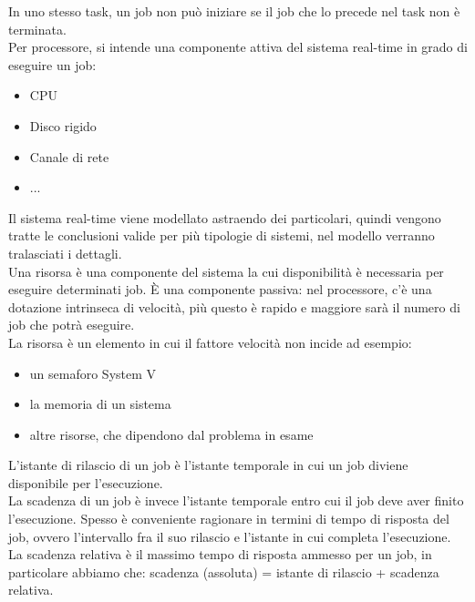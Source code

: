 \documentclass[12pt, oneside]{extbook}
\begin{document}
In uno stesso task, un job non può iniziare se il job che lo precede nel task non è terminata.\\ Per processore, si intende una componente attiva del sistema real-time in grado di eseguire un job:
\begin{itemize}
\item CPU
\item Disco rigido
\item Canale di rete
\item ...
\end{itemize}
Il sistema real-time viene modellato astraendo dei particolari, quindi vengono tratte le conclusioni valide per più tipologie di sistemi, nel modello verranno tralasciati i dettagli.\\ Una risorsa è una componente del sistema la cui disponibilità è necessaria per eseguire determinati job. È una componente passiva: nel processore, c'è una dotazione intrinseca di velocità, più questo è rapido e maggiore sarà il numero di job che potrà eseguire.\\ La risorsa è un elemento in cui il fattore velocità non incide ad esempio:
\begin{itemize}
\item un semaforo System V
\item la memoria di un sistema
\item altre risorse, che dipendono dal problema in esame
\end{itemize}
L'istante di rilascio di un job è l'istante temporale in cui un job diviene disponibile per l'esecuzione.\\ La scadenza di un job è invece l'istante temporale entro cui il job deve aver finito l'esecuzione. Spesso è conveniente ragionare in termini di tempo di risposta del job, ovvero l'intervallo fra il suo rilascio e l'istante in cui completa l'esecuzione.\\ La scadenza relativa è il massimo tempo di risposta ammesso per un job, in particolare abbiamo che: scadenza (assoluta) = istante di rilascio + scadenza relativa.
\end{document}

